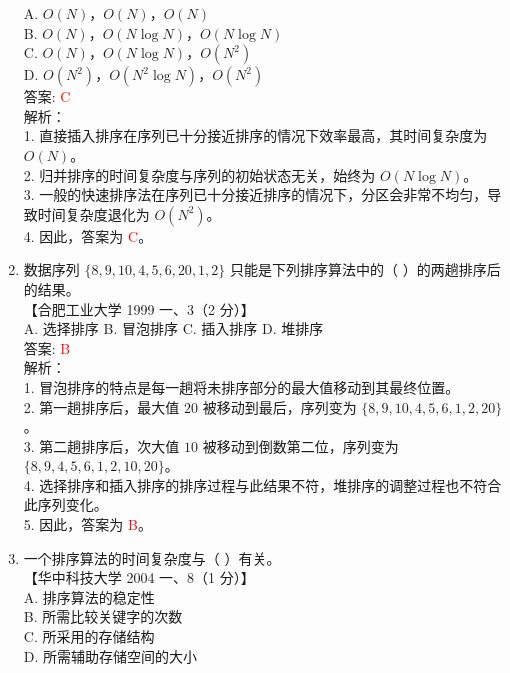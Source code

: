 \documentclass[lang=cn,newtx,10pt,scheme=chinese]{../../../elegantbook}
\begin{document}
\begin{enumerate}
    A. $O(N)$，$O(N)$，$O(N)$ \\  
    B. $O(N)$，$O(N \log N)$，$O(N \log N)$ \\  
    C. $O(N)$，$O(N \log N)$，$O(N^2)$ \\  
    D. $O(N^2)$，$O(N^2 \log N)$，$O(N^2)$ \\  

    答案: \textcolor{red}{C} \\

    解析：\\
    1. 直接插入排序在序列已十分接近排序的情况下效率最高，其时间复杂度为 $O(N)$。\\
    2. 归并排序的时间复杂度与序列的初始状态无关，始终为 $O(N \log N)$。\\
    3. 一般的快速排序法在序列已十分接近排序的情况下，分区会非常不均匀，导致时间复杂度退化为 $O(N^2)$。\\
    4. 因此，答案为 \textcolor{red}{C}。\\

    \item 数据序列 $\{8, 9, 10, 4, 5, 6, 20, 1, 2\}$ 只能是下列排序算法中的（ ）的两趟排序后的结果。\\
    【合肥工业大学 1999 一、3（2 分）】\\

    A. 选择排序 \quad B. 冒泡排序 \quad C. 插入排序 \quad D. 堆排序 \\

    答案: \textcolor{red}{B} \\

    解析：\\
    1. 冒泡排序的特点是每一趟将未排序部分的最大值移动到其最终位置。\\
    2. 第一趟排序后，最大值 $20$ 被移动到最后，序列变为 $\{8, 9, 10, 4, 5, 6, 1, 2, 20\}$。\\
    3. 第二趟排序后，次大值 $10$ 被移动到倒数第二位，序列变为 $\{8, 9, 4, 5, 6, 1, 2, 10, 20\}$。\\
    4. 选择排序和插入排序的排序过程与此结果不符，堆排序的调整过程也不符合此序列变化。\\
    5. 因此，答案为 \textcolor{red}{B}。\\  

    \item 一个排序算法的时间复杂度与（ ）有关。\\
    【华中科技大学 2004 一、8（1 分）】\\

    A. 排序算法的稳定性 \\  
    B. 所需比较关键字的次数 \\  
    C. 所采用的存储结构 \\  
    D. 所需辅助存储空间的大小 \\


\end{enumerate}
\end{document}
